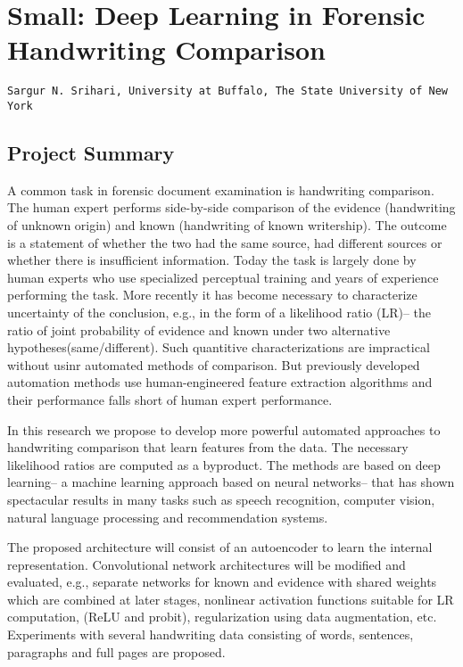 \documentclass[11pt, singlespacing]{article}  %
\begin{document}
%


\section*{Small: Deep Learning in Forensic Handwriting Comparison}
\begin{verbatim}
Sargur N. Srihari, University at Buffalo, The State University of New York
\end{verbatim}
\subsection*{Project Summary}
A common task in forensic document examination is  handwriting comparison. The human expert performs side-by-side comparison of the evidence (handwriting of unknown origin) and  known (handwriting of known writership). The outcome is a statement of whether the two had the same source, had different sources or whether there is insufficient information. Today the task is largely done by human experts who use specialized perceptual training and years of experience performing the task.
More recently it has become necessary to characterize uncertainty of the conclusion, e.g.,  in the form of a likelihood ratio (LR)-- the ratio of joint probability of evidence and known under two alternative hypotheses(same/different).  Such quantitive characterizations are impractical without usinr automated methods of comparison. But previously developed automation methods use human-engineered feature extraction algorithms and  their performance falls short of human expert performance. 

In this research we propose to develop more powerful automated approaches to handwriting comparison that learn features from the data. The necessary likelihood ratios are computed as a byproduct. The methods are based on deep learning-- a machine learning approach based on neural networks-- that has shown spectacular results in many tasks such as speech recognition, computer vision, natural language processing and recommendation systems.

The  proposed architecture will consist of an autoencoder to learn the internal representation. Convolutional network architectures will be modified and evaluated, e.g.,  separate networks for known and evidence with shared weights which are combined at later stages, nonlinear activation functions suitable for LR computation, (ReLU  and probit), regularization using data augmentation, etc. Experiments with several handwriting  data consisting of words, sentences, paragraphs and full pages are proposed.
\end{document}
